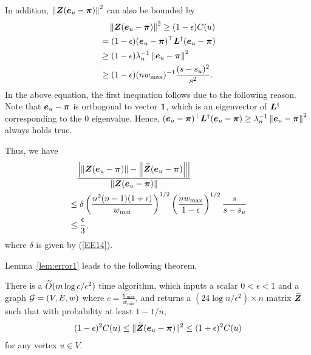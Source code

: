 \documentclass[journal]{IEEEtran}
\begin{document}
\begin{IEEEproof}
    In addition, \(\left\Vert\boldsymbol{Z} (\boldsymbol{e}_u - \boldsymbol{\pi})\right\Vert^2\) can also be bounded by
    \begin{equation}\label{EE17}
        \begin{split}  \notag
            &\quad\left\Vert\boldsymbol{Z} (\boldsymbol{e}_u - \boldsymbol{\pi})\right\Vert^2
            \geq
            (1 - \epsilon) C(u) \\
            &=(1-\epsilon)(\boldsymbol{e}_u-\boldsymbol{\pi})^{\top} \boldsymbol{L}^{\dagger} (\boldsymbol{e}_u-\boldsymbol{\pi}) \\
            &\geq (1-\epsilon)\lambda_{n}^{-1} \left\Vert\boldsymbol{e}_u-\boldsymbol{\pi}\right\Vert^2 \\
            &	\geq (1-\epsilon)(n w_{\max})^{-1} \frac{(s-s_u)^2}{s^2}.
        \end{split}
    \end{equation}
    In the above equation, the first inequation follows due to the following reason.   Note that \(\boldsymbol{e}_u-\boldsymbol{\pi}\) is orthogonal to  vector \(\boldsymbol{1}\), which is an eigenvector of \(\boldsymbol{L}^{\dagger}\) corresponding to the \(0\) eigenvalue. Hence, \((\boldsymbol{e}_u-\boldsymbol{\pi})^{\top} \boldsymbol{L}^{\dagger} (\boldsymbol{e}_u-\boldsymbol{\pi}) \ge \lambda_{n}^{-1} \left\Vert\boldsymbol{e}_u-\boldsymbol{\pi}\right\Vert^2\) always holds true.

    Thus, we have
    \begin{align*}
         & \quad \frac{
            \left| \left\Vert\boldsymbol{Z} (\boldsymbol{e}_{u} - \boldsymbol{\pi})\right\Vert -  \left\Vert\widetilde{\boldsymbol{Z}}  (\boldsymbol{e}_{u} - \boldsymbol{\pi})\right\Vert \right|
        }{
            \left\Vert\boldsymbol{Z} (\boldsymbol{e}_{u} - \boldsymbol{\pi})\right\Vert
        }                                                 \\
         & \le
        \delta \left(\frac{n^2(n-1) (1+\epsilon)}{w_{\min}}\right)^{1/2}\left(\frac{n
        w_{\max}}{1-\epsilon}\right)^{1/2}\frac{s}{s-s_u} \\
         & \le \frac{\epsilon}{3},
    \end{align*}
    where \(\delta\) is given by (\ref{EE14}).
\end{IEEEproof}

Lemma~\ref{lem:error1} leads to the following theorem.
\begin{theorem}
    \label{TheoAlg1}
    There is a \(\widetilde{O}(m\log{c}/\epsilon^2)\) time algorithm, which  inputs  a scalar \(0<\epsilon<1\) and a graph \(\mathcal{G}=(V,E,w)\) where \(c=\frac{w_{\max}}{w_{\min}}\), and returns a \((24\log n/\epsilon^2)\times n\) matrix \(\widetilde{\boldsymbol{Z}}\) such that with probability at least \(1-1/n\),
    \begin{align}
        (1-\epsilon)^2  C(u) \leq \|\widetilde{\boldsymbol{Z}}(\boldsymbol{e}_u-\boldsymbol{\pi})\|^2 \leq (1+\epsilon)^2  C(u)\nonumber
    \end{align}
    for any vertex \(u \in V\).
\end{theorem}
\end{document}
